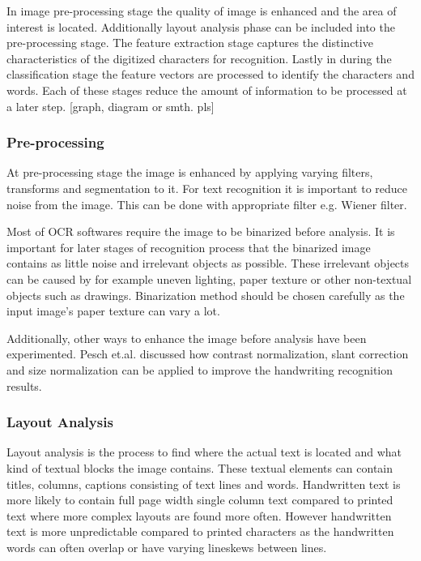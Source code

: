 \documentclass{article}
\begin{document}
    In image pre-processing stage the quality of image is enhanced and the area of interest is located. Additionally layout analysis phase can be included into the pre-processing stage. The feature extraction stage captures the distinctive characteristics of the digitized characters for recognition. Lastly in during the classification stage the feature vectors are processed to identify the characters and words. Each of these stages reduce the amount of information to be processed at a later step. \cite{Cheriet2007}
    [graph, diagram or smth. pls]

      \subsubsection{Pre-processing}
        At pre-processing stage the image is enhanced by applying varying filters, transforms and segmentation to it. For text recognition it is important to reduce noise from the image. This can be done with appropriate filter e.g. Wiener filter.

        Most of OCR softwares require the image to be binarized before analysis. It is important for later stages of recognition process that the binarized image contains as little noise and irrelevant objects as possible.  These irrelevant objects can be caused by for example uneven lighting, paper texture or other non-textual objects such as drawings. Binarization method should be chosen carefully as the input image's paper texture can vary a lot.

        Additionally, other ways to enhance the image before analysis have been experimented. Pesch et.al. discussed how contrast normalization, slant correction and size normalization can be applied to improve the handwriting recognition results. \cite{Pesch2012}

      \subsubsection{Layout Analysis}
        Layout analysis is the process to find where the actual text is located and what kind of textual blocks the image contains. These textual elements can contain titles, columns, captions consisting of text lines and words. Handwritten text is more likely to contain full page width single column text compared to printed text where more complex layouts are found more often. However handwritten text is more unpredictable compared to printed characters as the handwritten words can often overlap or have varying lineskews between lines.
\end{document}
